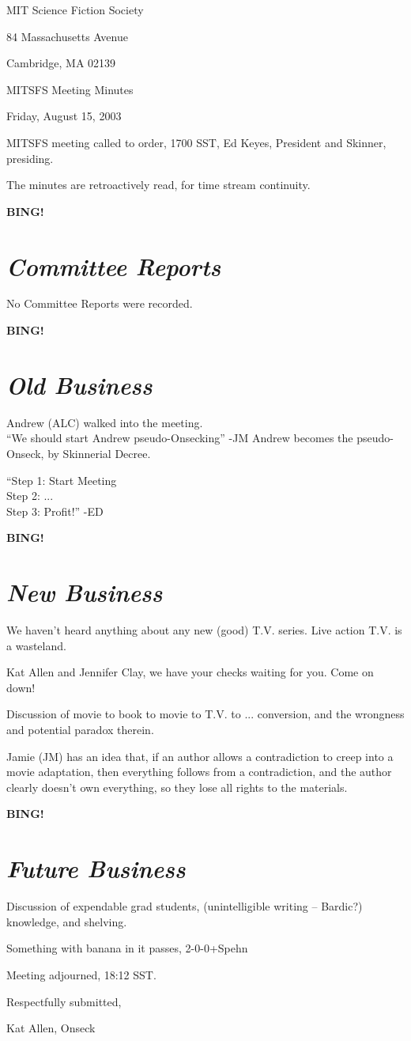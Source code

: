 \documentclass[10pt]{article}
\newcommand{\bing}{{\bf BING!} }
\newcommand{\goto}[1]{\bing \vskip 12pt \section*{{\em{#1}}}}
\begin{document}
\begin{center}

MIT Science Fiction Society 

84 Massachusetts Avenue

Cambridge, MA 02139

\vspace{12pt}

MITSFS Meeting Minutes 

Friday, August 15, 2003

\end{center}
 
\vspace{18pt}

\setlength{\parskip}{6pt}

\noindent

MITSFS meeting called to order, 1700 SST, Ed Keyes, President and
Skinner, presiding.

The minutes are retroactively read, for time stream continuity.

\goto{Committee Reports}

No Committee Reports were recorded.

\goto{Old Business}

Andrew (ALC) walked into the meeting. \\
``We should start Andrew pseudo-Onsecking'' -JM
Andrew becomes the pseudo-Onseck, by Skinnerial Decree.

``Step 1: Start Meeting \\
  Step 2: ...\\
  Step 3: Profit!'' -ED

\goto{New Business}

We haven't heard anything about any new (good) T.V. series.  Live
action T.V. is a wasteland.

Kat Allen and Jennifer Clay, we have your checks waiting for you. Come
on down!

Discussion of movie to book to movie to T.V. to ... conversion, and
the wrongness and potential paradox therein.

Jamie (JM) has an idea that, if an author allows a contradiction to
creep into a movie adaptation, then everything follows from a
contradiction, and the author clearly doesn't own everything, so they
lose all rights to the materials.

\goto{Future Business}

Discussion of expendable grad students,  (unintelligible writing -- Bardic?)
knowledge, and shelving.

Something with banana in it passes, 2-0-0+Spehn

\vspace{12pt}

\noindent
Meeting adjourned, 18:12 SST.

\vspace{18pt}

\centerline{Respectfully submitted,}
\centerline{Kat Allen,  Onseck}
\end{document}
